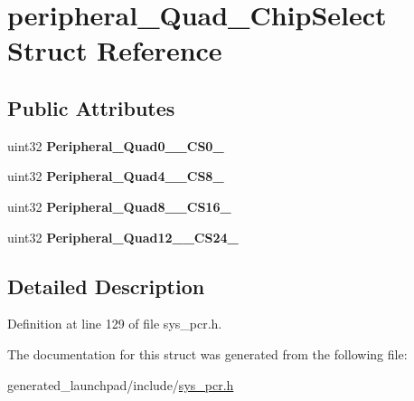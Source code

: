 \hypertarget{structperipheral__Quad__ChipSelect}{}\section{peripheral\+\_\+\+Quad\+\_\+\+Chip\+Select Struct Reference}
\label{structperipheral__Quad__ChipSelect}
\subsection*{Public Attributes}
\begin{DoxyCompactItemize}
\item 
\mbox{\label{structperipheral__Quad__ChipSelect_aae4b7477429aad725b9242f59d5ba579}} 
uint32 {\bfseries Peripheral\+\_\+\+Quad0\+\_\+\_\+\+C\+S0\+\_}
\item 
\mbox{\label{structperipheral__Quad__ChipSelect_ae9a4606e7dec5b43dd6681c83f1221ca}} 
uint32 {\bfseries Peripheral\+\_\+\+Quad4\+\_\+\_\+\+C\+S8\+\_}
\item 
\mbox{\label{structperipheral__Quad__ChipSelect_a2bdbfe7704169360c0c19cf1a549e052}} 
uint32 {\bfseries Peripheral\+\_\+\+Quad8\+\_\+\_\+\+C\+S16\+\_}
\item 
\mbox{\label{structperipheral__Quad__ChipSelect_a070adffdc60b6c732cebc09a2c259753}} 
uint32 {\bfseries Peripheral\+\_\+\+Quad12\+\_\+\_\+\+C\+S24\+\_}
\end{DoxyCompactItemize}


\subsection{Detailed Description}


Definition at line 129 of file sys\+\_\+pcr.\+h.



The documentation for this struct was generated from the following file\+:\begin{DoxyCompactItemize}
\item 
generated\+\_\+launchpad/include/\mbox{\hyperlink{sys__pcr_8h}{sys\+\_\+pcr.\+h}}\end{DoxyCompactItemize}

